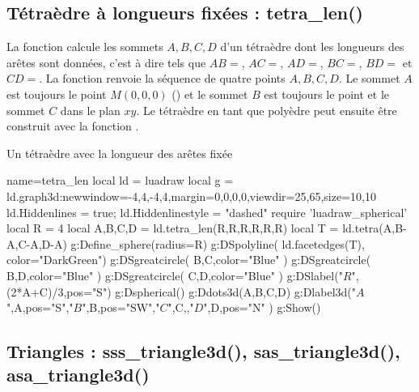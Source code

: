 \subsection{Tétraèdre à longueurs fixées : tetra\_len()}

La fonction  calcule les sommets $A,B,C,D$ d'un tétraèdre dont les longueurs des arêtes sont données, c'est à dire tels que $AB=$, $AC=$, $AD=$, $BC=$, $BD=$ et $CD=$. La fonction renvoie la séquence de quatre points $A,B,C,D$. Le sommet $A$ est toujours le point $M(0,0,0)$ () et le sommet $B$ est toujours le point  et le sommet $C$ dans le plan $xy$. Le tétraèdre en tant que polyèdre peut ensuite être construit avec la fonction .

\begin{demo}{Un tétraèdre avec la longueur des arêtes fixée}
\begin{luadraw}{name=tetra_len}
local ld = luadraw
local g = ld.graph3d:new{window={-4,4,-4,4},margin={0,0,0,0},viewdir={25,65},size={10,10}}
ld.Hiddenlines = true; ld.Hiddenlinestyle = "dashed"
require 'luadraw_spherical'
local R = 4
local A,B,C,D = ld.tetra_len(R,R,R,R,R,R)
local T = ld.tetra(A,B-A,C-A,D-A)
g:Define_sphere({radius=R})
g:DSpolyline( ld.facetedges(T), {color="DarkGreen"})
g:DSgreatcircle( {B,C},{color="Blue"} )
g:DSgreatcircle( {B,D},{color="Blue"} )
g:DSgreatcircle( {C,D},{color="Blue"}  )
g:DSlabel("$R$",(2*A+C)/3,{pos="S"})
g:Dspherical()
g:Ddots3d({A,B,C,D})
g:Dlabel3d("$A$",A,{pos="S"},"$B$",B,{pos="SW"},"$C$",C,{},"$D$",D,{pos="N"} )
g:Show()
\end{luadraw}
\end{demo}

\subsection{Triangles : sss\_triangle3d(), sas\_triangle3d(), asa\_triangle3d()}

